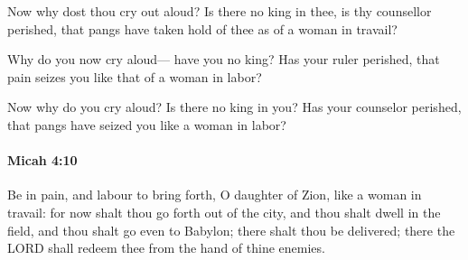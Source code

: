 			\begin{versebox}
					\item[BHS] 
					\item[LXX] 
					\item[ASV] Now why dost thou cry out aloud? Is there no king in thee, is thy counsellor perished, that pangs have taken hold of thee as of a woman in travail?
					\item[NIV] Why do you now cry aloud— have you no king? Has your ruler perished, that pain seizes you like that of a woman in labor?
					\item[NRSV] Now why do you cry aloud? Is there no king in you? Has your counselor perished, that pangs have seized you like a woman in labor?
			\end{versebox}

		\paragraph{Micah 4:10} %
			\label{MICAH-4-10}

			Be in pain, and labour to bring forth, O daughter of Zion, like a woman in travail: for now shalt thou go forth out of the city, and thou shalt dwell in the field, and thou shalt go even to Babylon; there shalt thou be delivered; there the LORD shall redeem thee from the hand of thine enemies.

